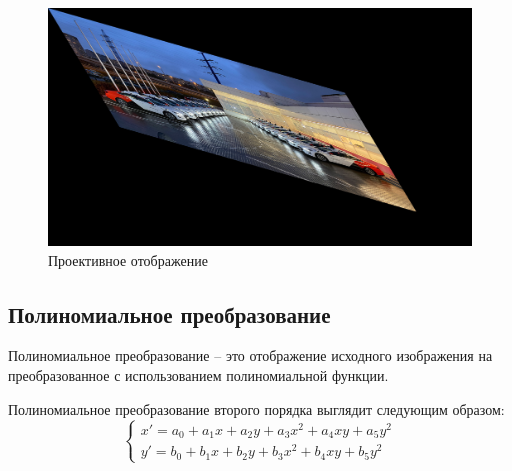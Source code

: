 \begin{figure}[ht]
    \includegraphics[width=\textwidth]{../outputs/image_projective.png}
    \caption{Проективное отображение}
    \label{fig:projective_image}
\end{figure}

\subsection{Полиномиальное преобразование}

Полиномиальное преобразование -- это отображение исходного изображения на преобразованное с использованием полиномиальной функции.

Полиномиальное преобразование второго порядка выглядит следующим образом:
\begin{equation}
\begin{cases}
    x' = a_0 + a_1x + a_2y + a_3x^2 + a_4xy + a_5y^2\\
    y' = b_0 + b_1x + b_2y + b_3x^2 + b_4xy + b_5y^2
\end{cases}
\end{equation}


